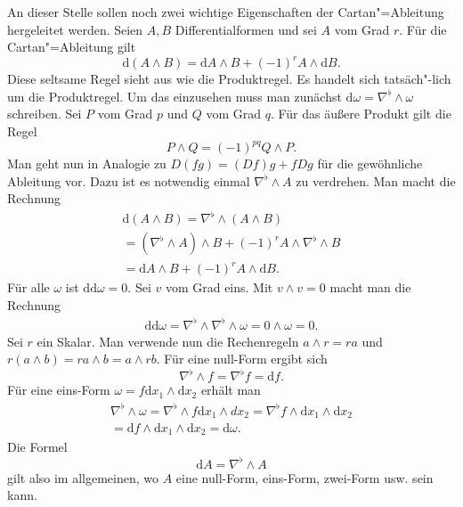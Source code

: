 \documentclass[a4paper,11pt,fleqn,twocolumn,twoside]{scrartcl}
\numberwithin{equation}{section}
\begin{document}
An dieser Stelle sollen noch zwei wichtige Eigenschaften der
Cartan"=Ableitung hergeleitet werden. Seien $A,B$ Differentialformen
und sei $A$ vom Grad $r$. Für die Cartan"=Ableitung gilt
\begin{equation}
\mathrm d(A\wedge B)
= \mathrm dA\wedge B + (-1)^r A\wedge \mathrm dB.
\end{equation}
Diese seltsame Regel sieht aus wie die Produktregel. Es handelt
sich tatsäch"-lich um die Produktregel. Um das einzusehen muss man
zunächst $\mathrm d\omega = \nabla^\flat\wedge\omega$ schreiben.
Sei $P$ vom Grad $p$ und $Q$ vom Grad $q$. Für das
äußere Produkt gilt die Regel
\begin{equation}
P\wedge Q = (-1)^{pq}Q\wedge P.
\end{equation}
Man geht nun in Analogie zu $D(fg)=(Df)g+fDg$ für die gewöhnliche
Ableitung vor. Dazu ist es notwendig einmal $\nabla^\flat\wedge A$
zu verdrehen. Man macht die Rechnung
\begin{gather*}
\mathrm d(A\wedge B) = \nabla^\flat\wedge (A\wedge B)\\
= (\nabla^\flat\wedge A)\wedge B
+ (-1)^r A\wedge\nabla^\flat\wedge B\\
= \mathrm dA\wedge B + (-1)^r A\wedge \mathrm dB.
\end{gather*}
Für alle $\omega$ ist $\mathrm {dd}\omega=0$.
Sei $v$ vom Grad eins.
Mit $v\wedge v=0$ macht man die Rechnung
\begin{gather*}
\mathrm{dd}\omega
= \nabla^\flat\wedge\nabla^\flat\wedge\omega
= 0\wedge\omega = 0.
\end{gather*}
Sei $r$ ein Skalar. Man verwende nun die Rechenregeln $a\wedge r=ra$ und
$r(a\wedge b) = ra\wedge b = a\wedge rb$. Für eine null-Form ergibt sich
\begin{equation}
\nabla^\flat\wedge f = \nabla^\flat f = \mathrm df.
\end{equation}
Für eine eins-Form $\omega = f\mathrm dx_1\wedge\mathrm dx_2$
erhält man
\begin{gather*}
\nabla^\flat\wedge\omega = \nabla^\flat\wedge f\mathrm dx_1\wedge dx_2
= \nabla^\flat f\wedge\mathrm dx_1\wedge\mathrm dx_2\\
= \mathrm df\wedge\mathrm dx_1\wedge\mathrm dx_2
= \mathrm d\omega.
\end{gather*}
Die Formel
\begin{equation}
\mathrm dA = \nabla^\flat\wedge A
\end{equation}
gilt also im allgemeinen, wo $A$ eine null-Form, eins-Form,
zwei-Form usw. sein kann.
\end{document}
